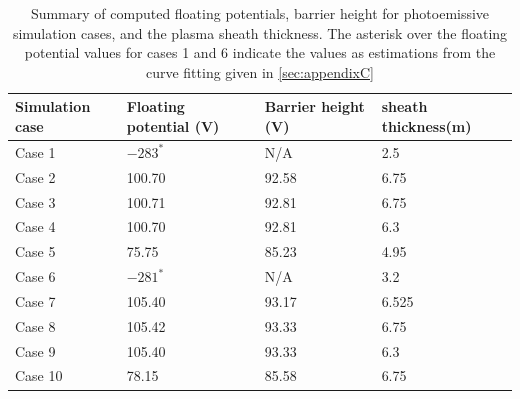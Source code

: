 \begin{center}
\begin{table}[H]
\begin{tabular}{p{2cm}|p{1.5cm}|p{1.5cm}|p{3cm}}
\toprule
\toprule
 Simulation case & Floating potential (V) & Barrier height (V) & sheath thickness(m)\\
\hline
Case 1 & $-283^{*}$ & N/A & 2.5\\
\hline
Case 2 & 100.70 & 92.58 & 6.75\\
\hline
Case 3 & 100.71 & 92.81 & 6.75\\
\hline
Case 4 & 100.70 & 92.81 & 6.3 \\
\hline
Case 5 & 75.75 & 85.23 & 4.95 \\
\hline
Case 6 & $-281^{*}$ & N/A & 3.2\\
\hline
Case 7 & 105.40 & 93.17 & 6.525 \\
\hline
Case 8 & 105.42 & 93.33 & 6.75 \\
\hline
Case 9 & 105.40 & 93.33 & 6.3 \\
\hline
Case 10 & 78.15 & 85.58 & 6.75 \\
\bottomrule
\bottomrule
\end{tabular}
\caption{Summary of computed floating potentials, barrier height for photoemissive simulation cases, and the plasma sheath thickness. The asterisk over the floating potential values for cases 1 and 6 indicate the values as estimations from the curve fitting given in \cref{sec:appendixC}}
\label{tab:MMOresultsSummary}
\end{table}
\end{center}